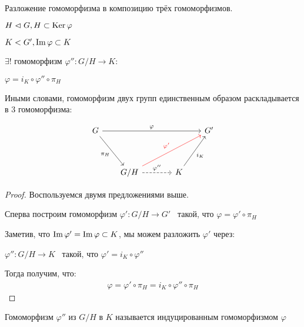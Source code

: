 \begin{theorem-non}
    Разложение гомоморфизма в композицию трёх гомоморфизмов.

    $H \vartriangleleft G, H \subset \operatorname{Ker} \varphi$

    $K < G', \operatorname{Im} \varphi \subset K$

    $\exists !$ гомоморфизм $\varphi'': G / H \to K:$

    $\varphi =  i_K \circ \varphi'' \circ \pi_H$

    Иными словами, гомоморфизм двух групп единственным образом раскладывается в 3 гомоморфизма:


    \[
    \begin{tikzcd}[row sep=huge, column sep=scriptsize]
        G \arrow{rrrr}{\varphi} \arrow[swap]{dr}{\pi_H} & & & & G' \\
        & G/H \arrow[red]{urrr}{\varphi'} \arrow[dashed]{rr}{\varphi''} & & K \arrow[swap]{ur}{i_K} 
    \end{tikzcd}
    \]

    \begin{proof}
        Воспользуемся двумя предложениями выше.

        Сперва построим гомоморфизм $\varphi': G / H \to G'$ \, такой, что $\varphi = \varphi' \circ \pi_H$

        Заметив, что $\operatorname{Im} \varphi' = \operatorname{Im} \varphi \subset K$, мы можем разложить $\varphi'$ через:

        $\varphi'': G / H \to K$ \, такой, что $\varphi' = i_K \circ \varphi''$

        Тогда получим, что: 
        \begin{gather*}
            \varphi = \varphi' \circ \pi_H = i_K \circ \varphi'' \circ \pi_H
        \end{gather*}
    \end{proof}

    \notice Гомоморфизм $\varphi''$ из $G / H$ в $K$ называется индуцированным гомоморфизмом $\varphi$
\end{theorem-non}
